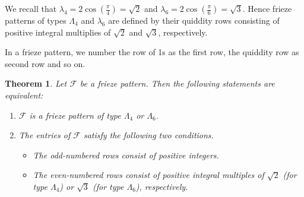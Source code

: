 \documentclass[11pt,a4paper]{amsart}
\newtheorem{Theorem}[Lemma]{Theorem}
\theoremstyle{definition}
\numberwithin{equation}{section}
\begin{document}
We recall that $\lambda_4=2\cos(\frac{\pi}{4})= \sqrt{2}$ and 
$\lambda_6=2\cos(\frac{\pi}{6})= \sqrt{3}$. Hence frieze patterns of types $\Lambda_4$ and
$\lambda_6$ are defined by their quiddity rows consisting of positive integral multiplies of
$\sqrt{2}$ and $\sqrt{3}$, respectively. 

In a frieze pattern, we number the row of 1s as the first row, the quiddity row as second row and so on. 


\begin{Theorem} \label{thm:lambda46}
Let $\mathcal{F}$ be a frieze pattern. Then the following statements are equivalent:
\begin{enumerate}
\item[{(a)}] $\mathcal{F}$ is a frieze pattern of type $\Lambda_4$ or $\Lambda_6$.
\item[{(b)}] The entries of $\mathcal{F}$ satisfy the following two conditions. 
\begin{itemize}
\item[{(i)}] The odd-numbered rows consist of positive integers.
\item[{(ii)}] The even-numbered rows consist of positive integral multiples of $\sqrt{2}$ (for type $\Lambda_4$)
or $\sqrt{3}$ (for type $\Lambda_6$), respectively.
\end{itemize}
\end{enumerate}
\end{Theorem}
\end{document}
